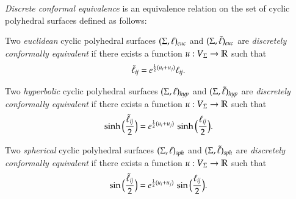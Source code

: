 \documentclass[Thesis]{subfiles}
\begin{document}
\begin{definition}
  \label{def:dconf}
  \emph{Discrete conformal equivalence} is an equivalence relation on
  the set of cyclic polyhedral surfaces defined as follows:
  \begin{compactitem}[$\bullet$]
  \item Two \emph{euclidean} cyclic polyhedral surfaces
    $(\Sigma,\ell)_{\euc}$ and $(\Sigma,\ellt)_{\euc}$ are
    \emph{discretely conformally equivalent} if there exists a
    function $u:V_{\Sigma}\rightarrow\mathbb R$ such that
    \begin{equation}
      \label{eq:tilde_ell_euc}
      \tilde{\ell}_\mathit{ij}=e^{\frac{1}{2}(u_{i}+u_{j})}\ell_\mathit{ij}.
    \end{equation}
  \item Two \emph{hyperbolic} cyclic polyhedral surfaces
    $(\Sigma,\ell)_{\mathit{hyp}}$ and $(\Sigma,\tilde{\ell})_{\mathit{hyp}}$ are \emph{discretely
      conformally equivalent} if there exists a function
    $u:V_{\Sigma}\rightarrow\mathbb R$ such that
    \begin{equation}
      \label{eq:tilde_ell_hyp}
      \sinh\Big(\frac{\tilde{\ell}_\mathit{ij}}{2}\Big)
      = e^{\frac{1}{2}(u_{i}+u_{j})}\,
      \sinh\Big(\frac{\ell_\mathit{ij}}{2}\Big).
    \end{equation}
  \item Two \emph{spherical} cyclic polyhedral surfaces
    $(\Sigma,\ell)_{\mathit{sph}}$ and $(\Sigma,\tilde{\ell})_{\mathit{sph}}$ are \emph{discretely
      conformally equivalent} if there exists a function
    $u:V_{\Sigma}\rightarrow\mathbb R$ such that
    \begin{equation}
      \label{eq:tilde_ell_sph}
      \sin\Big(\frac{\tilde{\ell}_\mathit{ij}}{2}\Big)
      = e^{\frac{1}{2}(u_{i}+u_{j})}\,
      \sin\Big(\frac{\ell_\mathit{ij}}{2}\Big).
    \end{equation}
  \end{compactitem}


\end{definition}
\end{document}

